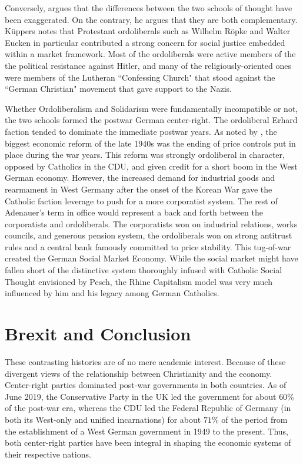 \documentclass{article}
\begin{document}
Conversely, \citet{kuppers2015} argues that the differences between the two schools of thought have been exaggerated.  On the contrary, he argues that they are both complementary.  K\"{u}ppers notes that Protestant ordoliberals such as Wilhelm R\"{o}pke and Walter Eucken in particular contributed a strong concern for social justice embedded within a market framework.  Most of the ordoliberals were active members of the the political resistance against Hitler, and many of the religiously-oriented ones were members of the Lutheran ``Confessing Church" that stood against the ``German Christian" movement that gave support to the Nazis.\medskip

Whether Ordoliberalism and Solidarism were fundamentally incompatible or not, the two schools formed the postwar German center-right.  The ordoliberal Erhard faction tended to dominate the immediate postwar years.  As noted by \citet{hien2013}, the biggest economic reform of the late 1940s was the ending of price controls put in place during the war years.  This reform was strongly ordoliberal in character, opposed by Catholics in the CDU, and given credit for a short boom in the West German economy.  However, the increased demand for industrial goods and rearmament in West Germany after the onset of the Korean War gave the Catholic faction leverage to push for a more corporatist system.  The rest of Adenauer’s term in office would represent a back and forth between the corporatists and ordoliberals.  The corporatists won on industrial relations, works councils, and generous pension system, the ordoliberals won on strong antitrust rules and a central bank famously committed to price stability.  This tug-of-war created the German Social Market Economy.  While the social market might have fallen short of the distinctive system thoroughly infused with Catholic Social Thought envisioned by Pesch, the Rhine Capitalism model was very much influenced by him and his legacy among German Catholics.

\section{Brexit and Conclusion}

These contrasting histories are of no mere academic interest.  Because of these divergent views of the relationship between Christianity and the economy.  Center-right parties dominated post-war governments in both countries.  As of June 2019, the Conservative Party in the UK led the government for about $ 60\% $ of the post-war era, whereas the CDU led the Federal Republic of Germany (in both its West-only and unified incarnations) for about $ 71\% $ of the period from the establishment of a West German government in 1949 to the present.  Thus, both center-right parties have been integral in shaping the economic systems of their respective nations.\medskip
\end{document}
